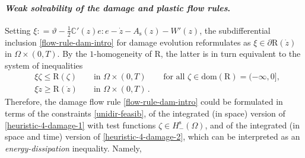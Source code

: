 \documentclass[a4paper,10pt,reqno]{amsart}
\numberwithin{equation}{section}
\numberwithin{equation}{section}
\newcommand{\down}{\downarrow}
\newcommand{\teta}{\vartheta}
\newcommand{\bbC}{\mathbb{C}}
\newcommand{\did}[1]{\mathrm{R}(#1)}
\newcommand{\didname}{\mathrm{R}}
\newcommand{\As}{A_{\mathrm{s}}}
\begin{document}
\paragraph{{\em Weak solvability of the damage and plastic flow rules}.}
Setting
  $
   \xi: = \teta  - \tfrac12\bbC'(z)e : e - \dot{z}   - \As (z) - W'(z)$, 
     the subdifferential inclusion \eqref{flow-rule-dam-intro} for damage evolution reformulates as 
  $
  \xi \in \partial\did{\dot{z}} $ in $\Omega \times (0,T)$. By the $1$-homogeneity of $\didname$,    the latter  is in turn equivalent to the system of inequalities
  \begin{subequations}
  \label{heuristic-4-damage}
  \begin{align}
      \label{heuristic-4-damage-1}
  &
  \xi \zeta \leq \did{\zeta} && \text{ in } \Omega \times (0,T)  &&  \text{for all } \zeta \in \mathrm{dom}(\didname) = (-\infty,0],
  \\
    \label{heuristic-4-damage-2}
    &
  \xi \dot{z} \geq \did{\dot z}  && \text{ in } \Omega \times (0,T)\,. &&
  \end{align}
  \end{subequations}
  Therefore, the damage flow rule  \eqref{flow-rule-dam-intro} could be formulated in terms 
  of the  constraints 
  \eqref{unidir-feasib},
  of the integrated (in space) version of \eqref{heuristic-4-damage-1} with test functions $\zeta \in H_-^{\mathrm{s}}(\Omega)$,
   and of the integrated (in space and time) version of \eqref{heuristic-4-damage-2}, which can be interpreted as an  \emph{energy-dissipation} inequality. 
   Namely,  
\end{document}
